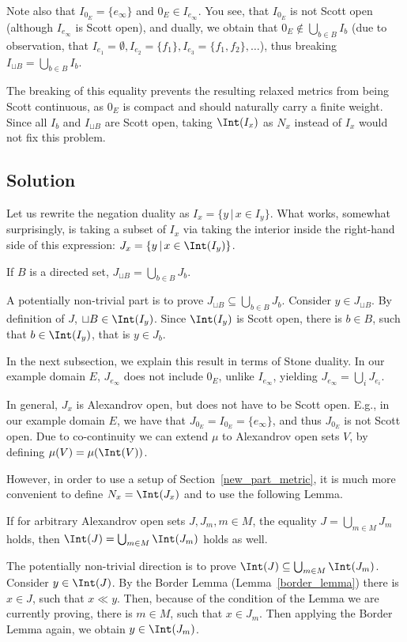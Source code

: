 Note also that $I_{0_E} = \{e_{\infty}\}$ and $0_E \in I_{e_{\infty}}$. 
You see, that $I_{0_E}$ is not Scott open (although 
$I_{e_{\infty}}$ is Scott open),
and dually, we obtain that $0_E \not\in \bigcup_{b \in B} I_b$
(due to observation, that $I_{e_1} = \emptyset,
I_{e_2} = \{f_1\}, I_{e_3} = \{f_1,f_2\},
\ldots$), thus breaking  $I_{\sqcup B} = \bigcup_{b \in B} I_b$.

The breaking of this equality prevents the resulting relaxed metrics
from being Scott continuous, as $0_E$ is compact and should naturally
carry a finite weight. Since all $I_b$ and $I_{\sqcup B}$ are Scott open,
taking $\Int(I_x)$ as $N_x$ instead of $I_x$ would not fix this problem. 

\subsection{Solution}

Let us rewrite the negation duality as $I_x = \{y\,|\,x \in I_y\}$.
What works, somewhat surprisingly, is taking a subset of $I_x$ via
taking the interior inside the right-hand side of this expression:
$J_x = \{y\,|\,x \in \Int(I_y)\}$.

\begin{Lemma}\label{sec:jgood}
If $B$ is a directed set, 
$J_{\sqcup B} = \bigcup_{b \in B} J_b$.
\end{Lemma}
\Proof
A potentially non-trivial part is to prove
$J_{\sqcup B} \subseteq \bigcup_{b \in B} J_b$.
Consider $y \in J_{\sqcup B}$. By definition of $J$,
$\sqcup B \in \Int(I_y)$. Since $\Int(I_y)$ is Scott open,
there is $b \in B$, such that $b \in \Int(I_y)$, that is
$y \in J_b$.
\eproof

In the next subsection, we explain this result in terms
of Stone duality. In our example domain $E$, $J_{e_{\infty}}$
does not include $0_E$, unlike $I_{e_{\infty}}$, yielding
$J_{e_{\infty}} = \bigcup_i J_{e_i}$.

In general, $J_x$ is Alexandrov open, but does not have to
be Scott open. E.g., in our example domain $E$,
we have that
$J_{0_E} = I_{0_E} = \{e_{\infty}\}$, and thus $J_{0_E}$ is not Scott open.
Due to co-continuity we can extend $\mu$ to Alexandrov open
sets $V$, by defining $\mu (V) = \mu (\Int(V))$.

However, in order to use a setup of Section~\ref{new_part_metric},
it is much more convenient to define $N_x = \Int(J_x)$ and to use
the following Lemma.

\begin{Lemma} If for arbitrary Alexandrov open sets $J, J_m, m \in M$,
the equality $J = \bigcup_{m \in M} J_m$ holds,
then $\Int(J) = \bigcup_{m \in M} \Int(J_m)$ holds as well.
\end{Lemma}
\Proof
The potentially non-trivial direction is to prove
$\Int(J) \subseteq \bigcup_{m \in M} \Int(J_m)$.
Consider $y \in \Int(J)$. By the Border Lemma (Lemma~\ref{border_lemma})
there is $x \in J$, such that $x \ll y$. Then, because of the
condition of the Lemma we are currently proving, there is $m \in M$,
such that $x \in J_m$. Then applying the Border Lemma again,
we obtain $y \in \Int(J_m)$.
\eproof

